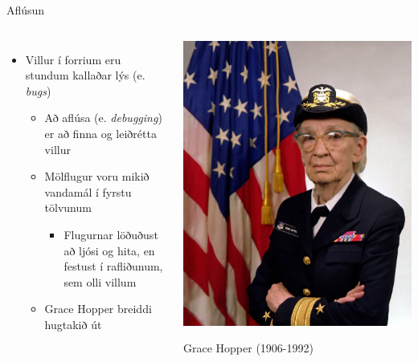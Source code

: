 \documentclass{beamer}
\begin{document}
\begin{frame}{Aflúsun}
\begin{columns}
\begin{itemize}
 \item Villur í forrium eru stundum kallaðar lýs (e. \emph{bugs})
 \begin{itemize}
  \item Að aflúsa (e. \emph{debugging}) er að finna og leiðrétta villur
 \end{itemize}
 \begin{itemize}
  \item Mölflugur voru mikið vandamál í fyrstu tölvunum
  \begin{itemize}
   \item Flugurnar löðuðust að ljósi og hita, en festust í rafliðunum, sem olli villum
  \end{itemize}
 \item Grace Hopper breiddi hugtakið út
 \end{itemize}
\end{itemize}
\begin{center}
\includegraphics[width=0.8\linewidth]{Pics/grace_hopper}

{\scriptsize Grace Hopper (1906-1992) }
\end{center}
\end{columns}
\end{frame}
\end{document}
